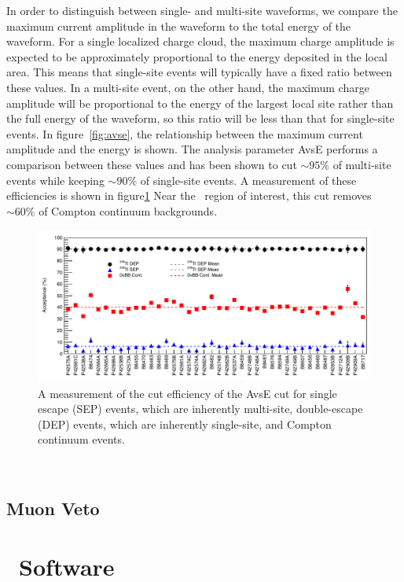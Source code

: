 \documentclass[/main.tex]{subfiles}
\begin{document}
In order to distinguish between single- and multi-site waveforms, we compare the maximum current amplitude in the waveform to the total energy of the waveform\cite{mjdavse}.
For a single localized charge cloud, the maximum charge amplitude is expected to be approximately proportional to the energy deposited in the local area.
This means that single-site events will typically have a fixed ratio between these values.
In a multi-site event, on the other hand, the maximum charge amplitude will be proportional to the energy of the largest local site rather than the full energy of the waveform, so this ratio will be less than that for single-site events.
In figure~\ref{fig:avse}, the relationship between the maximum current amplitude and the energy is shown.
The analysis parameter AvsE performs a comparison between these values and has been shown to cut $\sim95\%$ of multi-site events while keeping $\sim90\%$ of single-site events.
A measurement of these efficiencies is shown in figure\ref{fig:avseeff}
Near the \znbb\ region of interest, this cut removes $\sim60\%$ of Compton continuum backgrounds.
\begin{figure}
  \centering
  \includegraphics[width=\textwidth]{avseefficiency}
  \caption[Multi-site waveform cut efficiency]{\label{fig:avseeff}
    A measurement of the cut efficiency of the AvsE cut for single escape (SEP) events, which are inherently multi-site, double-escape (DEP) events, which are inherently single-site, and Compton continuum events.
  }
\end{figure}
\\

\subsection{Muon Veto}

\section{\MJD\ Software}
\end{document}
